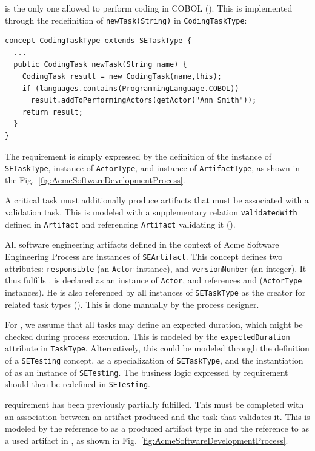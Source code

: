  is the only one allowed to perform coding in COBOL (). This is implemented through the redefinition of \texttt{newTask(String)} in \texttt{CodingTaskType}:

\begin{lstlisting}
concept CodingTaskType extends SETaskType {
  ...
  public CodingTask newTask(String name) {
    CodingTask result = new CodingTask(name,this);
    if (languages.contains(ProgrammingLanguage.COBOL))
      result.addToPerformingActors(getActor("Ann Smith"));
    return result;
  }
}
\end{lstlisting}

The requirement  is simply expressed by the definition of the
 instance of \texttt{SETaskType},  instance of
\texttt{ActorType}, and  instance of \texttt{ArtifactType},
as shown in the Fig.~\ref{fig:AcmeSoftwareDevelopmentProcess}.

A critical task must additionally produce artifacts that must be associated
with a validation task. This is modeled with a supplementary relation
\texttt{validatedWith} defined in \texttt{Artifact} and referencing
\texttt{Artifact} validating it ().

All software engineering artifacts defined in the context of Acme Software
Engineering Process are  instances of \texttt{SEArtifact}. This concept defines
two attributes: \texttt{responsible} (an \texttt{Actor} instance), and
\texttt{versionNumber} (an integer). It thus fulfills .  is declared as an instance of \texttt{Actor}, and references
 and  (\texttt{ActorType} instances). He is also
referenced by all instances of \texttt{SETaskType} as the creator for related
task types (). This is done manually by the process designer.


For , we assume that all tasks may define an expected duration,
which might be checked during process execution. This is modeled by the
\texttt{expectedDuration} attribute in \texttt{TaskType}. Alternatively, this
could be modeled through the definition of a \texttt{SETesting} concept, as a
specialization of \texttt{SETaskType}, and the instantiation of 
as an instance of \texttt{SETesting}. The business logic expressed by
 requirement should then be redefined in \texttt{SETesting}.

 requirement has been previously partially fulfilled. This must be
completed with an association between an artifact produced and the task that
validates it. This is modeled by the reference to  as a
produced artifact type in  and the reference to
 as a used artifact in , as shown in
Fig.~\ref{fig:AcmeSoftwareDevelopmentProcess}.

